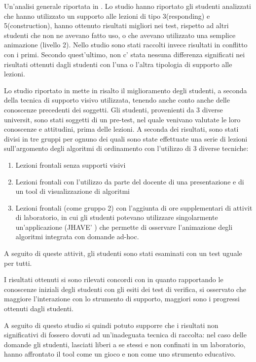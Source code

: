 Un'analisi generale riportata in \cite{AV-compare}. Lo studio \cite{byrne}
hanno riportato gli studenti analizzati che hanno utilizzato un supporto
alle lezioni di tipo 3(responding) e 5(construction), hanno ottenuto
risultati migliori nei test, rispetto ad altri studenti che non ne
avevano fatto uso, o che avevano utilizzato una semplice animazione
(livello 2). Nello studio \cite{jarc} sono stati raccolti invece
risultati in conflitto con i primi. Secondo quest'ultimo, non c'
stata nessuna differenza significati nei risultati ottenuti dagli
studenti con l'una o l'altra tipologia di supporto alle lezioni.

Lo studio riportato in \cite{AV-compare} mette in risalto il miglioramento
degli studenti, a seconda della tecnica di supporto visivo utilizzata,
tenendo anche conto anche delle conoscenze precedenti dei soggetti.
Gli studenti, provenienti da 3 diverse universit, sono stati soggetti
di un pre-test, nel quale venivano valutate le loro conoscenze e attitudini,
prima delle lezioni. A seconda dei risultati, sono stati divisi in
tre gruppi per ognuno dei quali sono state effettuate una serie di
lezioni sull'argomento degli algoritmi di ordinamento con l'utilizzo
di 3 diverse tecniche: 
\begin{enumerate}
\item Lezioni frontali senza supporti visivi 
\item Lezioni frontali con l'utilizzo da parte del docente di una presentazione
e di un tool di visualizzazione di algoritmi 
\item Lezioni frontali (come gruppo 2) con l'aggiunta di ore supplementari
di attivit di laboratorio, in cui gli studenti potevano utilizzare
singolarmente un'applicazione (JHAVE' \cite{JHAVE}) che permette
di osservare l'animazione degli algoritmi integrata con domande ad-hoc. 
\end{enumerate}
A seguito di queste attivit, gli studenti sono stati esaminati con
un test uguale per tutti.

I risultati ottenuti si sono rilevati concordi con \cite{byrne} in
quanto rapportando le conoscenze iniziali degli studenti con gli esiti
dei test di verifica, si osservato che maggiore l'interazione con
lo strumento di supporto, maggiori sono i progressi ottenuti dagli
studenti.

A seguito di questo studio si quindi potuto supporre che i risultati
non significativi di \cite{jarc} fossero dovuti ad un'inadeguata
tecnica di raccolta: nel caso delle domande gli studenti, lasciati
liberi a se stessi e non confinati in un laboratorio, hanno affrontato
il tool come un gioco e non come uno strumento educativo.

